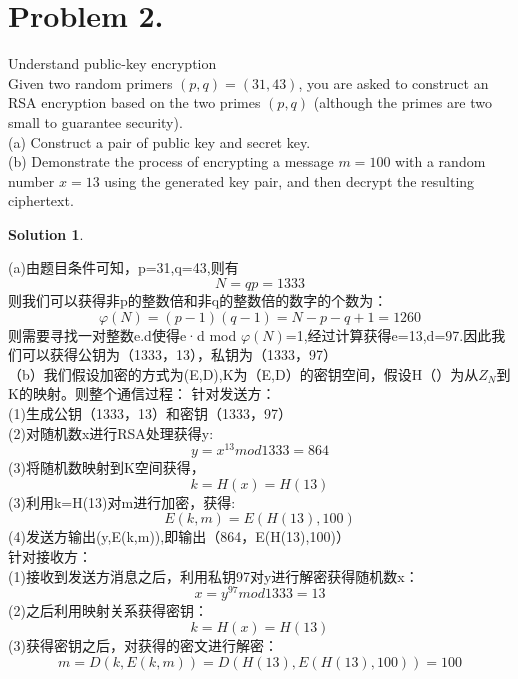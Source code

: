\documentclass[UTF8,oneside]{article}
\newtheorem*{Solution}{Solution}
\begin{document}
\section*{Problem 2.}
Understand public-key encryption\\
Given two random primers $(p, q)=(31,43)$, you are asked to construct an RSA encryption based on the two primes $(p, q)$ (although the primes are two small to guarantee security).\\
(a) Construct a pair of public key and secret key.\\
(b) Demonstrate the process of encrypting a message $m=100$ with a random number $x=13$ using the generated key pair, and then decrypt the resulting ciphertext.
\begin{Solution}
\end{Solution}
(a)由题目条件可知，p=31,q=43,则有$$N=qp=1333$$
则我们可以获得非p的整数倍和非q的整数倍的数字的个数为：$$\varphi(N)=(p-1)(q-1)=N-p-q+1=1260$$
则需要寻找一对整数e.d使得e·d mod $\varphi(N)$=1,经过计算获得e=13,d=97.因此我们可以获得公钥为（1333，13），私钥为（1333，97）\\
（b）我们假设加密的方式为(E,D),K为（E,D）的密钥空间，假设H（）为从$Z_N$到K的映射。则整个通信过程：
针对发送方：\\
(1)生成公钥（1333，13）和密钥（1333，97）\\
(2)对随机数x进行RSA处理获得y:$$y=x^{13} mod1333=864$$
(3)将随机数映射到K空间获得，$$k=H(x)=H(13)$$
(3)利用k=H(13)对m进行加密，获得:$$E(k,m)=E(H(13),100)$$
(4)发送方输出(y,E(k,m)),即输出（864，E(H(13),100)）$$ $$
针对接收方：\\
(1)接收到发送方消息之后，利用私钥97对y进行解密获得随机数x：$$x=y^{97} mod 1333=13$$
(2)之后利用映射关系获得密钥：$$k=H(x)=H(13)$$
(3)获得密钥之后，对获得的密文进行解密：$$m=D(k,E(k,m))=D(H(13),E(H(13),100))=100$$

\end{document}
